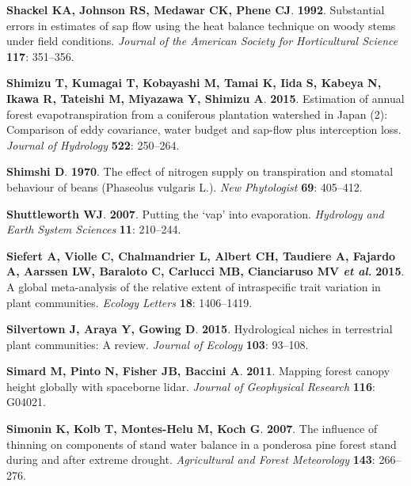 \documentclass[11pt,twoside]{reedthesis}
\begin{document}
\hypertarget{ref-Shackel1992}{}
\textbf{\textnormal{Shackel KA}, \textnormal{Johnson RS},
\textnormal{Medawar CK}, \textnormal{Phene CJ}}. \textbf{1992}.
Substantial errors in estimates of sap flow using the heat balance
technique on woody stems under field conditions. \emph{Journal of the
American Society for Horticultural Science} \textbf{117}: 351--356.

\hypertarget{ref-Shimizu2015}{}
\textbf{\textnormal{Shimizu T}, \textnormal{Kumagai T},
\textnormal{Kobayashi M}, \textnormal{Tamai K}, \textnormal{Iida S},
\textnormal{Kabeya N}, \textnormal{Ikawa R}, \textnormal{Tateishi M},
\textnormal{Miyazawa Y}, \textnormal{Shimizu A}}. \textbf{2015}.
Estimation of annual forest evapotranspiration from a coniferous
plantation watershed in Japan (2): Comparison of eddy covariance, water
budget and sap-flow plus interception loss. \emph{Journal of Hydrology}
\textbf{522}: 250--264.

\hypertarget{ref-shimshi_effect_1970}{}
\textbf{\textnormal{Shimshi D}}. \textbf{1970}. The effect of nitrogen
supply on transpiration and stomatal behaviour of beans (Phaseolus
vulgaris L.). \emph{New Phytologist} \textbf{69}: 405--412.

\hypertarget{ref-Shuttleworth2008}{}
\textbf{\textnormal{Shuttleworth WJ}}. \textbf{2007}. Putting the `vap'
into evaporation. \emph{Hydrology and Earth System Sciences}
\textbf{11}: 210--244.

\hypertarget{ref-Siefert2015}{}
\textbf{\textnormal{Siefert A}, \textnormal{Violle C},
\textnormal{Chalmandrier L}, \textnormal{Albert CH},
\textnormal{Taudiere A}, \textnormal{Fajardo A}, \textnormal{Aarssen
LW}, \textnormal{Baraloto C}, \textnormal{Carlucci MB},
\textnormal{Cianciaruso MV} \emph{et al.}} \textbf{2015}. A global
meta-analysis of the relative extent of intraspecific trait variation in
plant communities. \emph{Ecology Letters} \textbf{18}: 1406--1419.

\hypertarget{ref-Silvertown2015}{}
\textbf{\textnormal{Silvertown J}, \textnormal{Araya Y},
\textnormal{Gowing D}}. \textbf{2015}. Hydrological niches in
terrestrial plant communities: A review. \emph{Journal of Ecology}
\textbf{103}: 93--108.

\hypertarget{ref-simard_mapping_2011}{}
\textbf{\textnormal{Simard M}, \textnormal{Pinto N}, \textnormal{Fisher
JB}, \textnormal{Baccini A}}. \textbf{2011}. Mapping forest canopy
height globally with spaceborne lidar. \emph{Journal of Geophysical
Research} \textbf{116}: G04021.

\hypertarget{ref-simonin2007}{}
\textbf{\textnormal{Simonin K}, \textnormal{Kolb T},
\textnormal{Montes-Helu M}, \textnormal{Koch G}}. \textbf{2007}. The
influence of thinning on components of stand water balance in a
ponderosa pine forest stand during and after extreme drought.
\emph{Agricultural and Forest Meteorology} \textbf{143}: 266--276.
\end{document}
